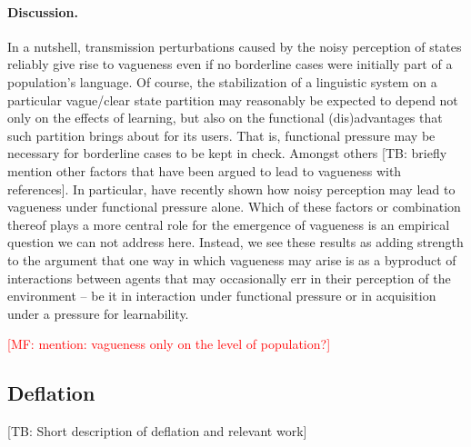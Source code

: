 \documentclass[10pt,a4paper]{article}
\newcommand{\mf}[1]{\textcolor{Red}{[MF: #1]}}
\newcommand{\tb}[1]{\textcolor[rgb]{.8,.33,.0}{[TB: #1]}}%
\begin{document}
\paragraph{Discussion.}
In a nutshell, transmission perturbations caused by the noisy perception of states reliably give rise to vagueness even if no borderline cases were initially part of a population's language. Of course, the stabilization of a linguistic system on a particular vague/clear state partition may reasonably be expected to depend not only on the effects of learning, but also on the functional (dis)advantages that such partition brings about for its users. That is, functional pressure may be necessary for borderline cases to be kept in check. Amongst others \tb{briefly mention other factors that have been argued to lead to vagueness with references}. In particular, \citet{franke+correia:toappear} have recently shown how noisy perception may lead to vagueness under functional pressure alone. Which of these factors or combination thereof plays a more central role for the emergence of vagueness is an empirical question we can not address here. Instead, we see these results as adding strength to the argument that one way in which vagueness may arise is as a byproduct of interactions between agents that may occasionally err in their perception of the environment -- be it in interaction under functional pressure or in acquisition under a pressure for learnability. 

\mf{mention: vagueness only on the level of population?}

\subsection{Deflation}

\tb{Short description of deflation and relevant work}
\end{document}
